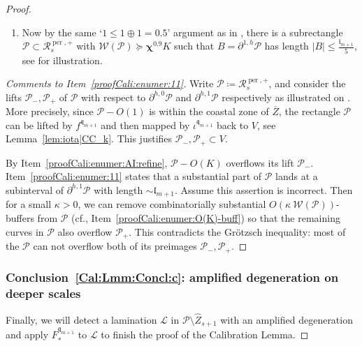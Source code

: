 \documentclass{amsart}
\newcommand{\1}{{\mathbb 1 }}
\newcommand{\Width}{{\mathcal W}}
\newcommand\RR{\mathcal{R}}
\newcommand{\wZ}{{\widehat Z}}
\newcommand{\qq}{\mathfrak{q}}
\newcommand{\length}{{\mathfrak l}}
\newcommand\PP{\mathcal{P}}
\newcommand\per{{\operatorname{per}}}
\theoremstyle{remark}
\numberwithin{equation}{section}
\theoremstyle{definition}
\newcommand{\bchi}{{\boldsymbol{ \chi}}}
\begin{document}
\begin{proof}
\begin{enumerate}[label=\text{(\arabic*)},font=\normalfont,leftmargin=*,start=16]
   \noindent For the definiteness, we assume that the $\RR^{\per,+}_s$ goes to $T_{s+ 1 }\cup f^{\qq_{m+1}}\big(T_{s+ 1 }\big)$ and has width $\bchi^{0.9} K$.

   \item\label{proofCali:enumer:11} Now by the same `$1 \leq 1\oplus 1 = 0.5$' argument as in \cite[Claim 5 in \S~9]{DL22}, there is a subrectangle $\mathcal P\subset \RR_s^{\per,+}$ with $\Width(\mathcal P)\succeq \bchi^{0.9} K$ such that  $B=  \partial^{1,h}\mathcal P$ has length $|B| \leq \frac{\length_{m+1}}{5}$, see \cite[Figure 26]{DL22} for illustration.
\end{enumerate}
\begin{proof}[Comments to Item~\ref{proofCali:enumer:11}]
  Write $\mathcal P\coloneqq \RR_s^{\per,+}$, and consider the lifts $\mathcal P_-,\mathcal P_+$ of $\mathcal P$ with respect to $\partial^{h,0} \mathcal P$ and $\partial^{h,1} \mathcal P$ respectively as illustrated on \cite[Figure 26]{DL22}. More precisely, since $\mathcal P-O(1)$ is within the coastal zone of $\overline Z$, the rectangle $\mathcal P$ can be lifted by $f^{\qq_{m+1}}$ and then mapped by $\iota^{\qq_{m+1}}$ back to $V$, see Lemma~\ref{lem:iota|CC_k}. This justifies $\mathcal P_-,\mathcal P_+ \subset V$.
  
  
  By Item~\ref{proofCali:enumer:AI:refine}, $\mathcal P- O(K)$ overflows its lift $\mathcal P_-$.  Item~\ref{proofCali:enumer:11} states that a substantial part of $\mathcal P$ lands at a subinterval of $\partial^{h,1}\mathcal P$ with length $\sim \length_{m+1}$. Assume this assertion is incorrect. Then for a small $\kappa>0$, we can remove combinatorially substantial $O(\kappa\ \Width(\PP))$-buffers from $\mathcal P$ (cf., Item~\ref{proofCali:enumer:O(K)-buff}) so that the remaining curves in $\PP$ also overflow $\mathcal P_+$. This contradicts the Gr\"otzsch inequality: most of the $\mathcal P$ can not overflow both of its preimages $\mathcal P_-,\mathcal P_+$.
    
\end{proof}

\subsubsection{Conclusion~\ref{Cal:Lmm:Concl:c}: amplified degeneration on deeper scales} \label{sss:prf:CL:concl:3}  Finally, we will detect a lamination $\mathcal L$ in $\mathcal P\setminus \wZ_{s+1}$ with an amplified degeneration and apply $F^{\qq_{m+1}}_*$ to $\mathcal L$ to finish the proof of the Calibration Lemma.


\end{proof}
\end{document}
